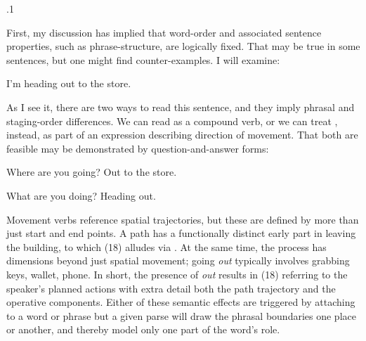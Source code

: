 \documentclass[11pt, twocolumn]{article}
\begin{document}
\p.1{%
\:\+First, my discussion has implied that word-order and associated
sentence properties, such as phrase-structure, are logically
fixed. \> \pgl{}That
may be true in some sentences, but one might find
counter-examples. \>  I will examine:

\begin{exsGroup}

\exsItem{}  \>  I'm heading out to the store. \> 

\end{exsGroup}

\nip{}%
As I see it, there are two ways to read this sentence, and they imply phrasal
and staging-order differences. \>  We can read  as a compound
verb, or we can treat , instead, as part of an expression describing
direction of movement. \>  That both are feasible may be demonstrated by
question-and-answer forms:

\begin{exsGroup}

\exsItem{}  \>  Where are you going? \>  Out to the store. \> 

\exsItem{}  \>  What are you doing? \>  Heading out. \> 

\end{exsGroup}

\nip{}%
Movement verbs reference spatial trajectories, but these are
defined by more than just start and end points. \>  A path
 has a functionally distinct early part in leaving
the building, to which \exsRef(18) alludes via . \>  At the same time,
the process has dimensions beyond just spatial movement; going
\textit{out} typically involves grabbing keys, wallet, phone. \> 
In short, the presence of \textit{out} results in \exsRef(18) referring to
the speaker's planned actions with extra detail both \visavis{} the
path trajectory and the operative components. \>  Either of these
semantic effects are triggered by attaching  to a word
or phrase \mdash{} but a given parse will draw the phrasal boundaries
one place or another, and thereby model only one part of the word's role.\<\;
}%
\end{document}
